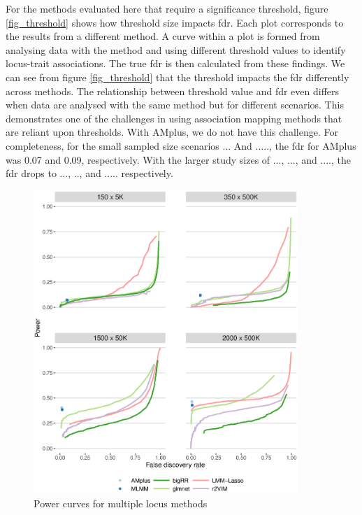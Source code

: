 \documentclass[12pt]{article}
\begin{document}
For the methods evaluated here that require a significance threshold, figure  \ref{fig_threshold}  shows how 
threshold size impacts fdr. Each plot corresponds to the results from a different method. 
A curve within a plot is formed from analysing data with the method and using different threshold values to identify locus-trait associations. 
The true fdr is then calculated from these findings.
We can see from figure \ref{fig_threshold}  that the threshold impacts the fdr differently across methods. The relationship between threshold value and fdr even differs when data are analysed with the same method but for different scenarios. This demonstrates one of the challenges in using association mapping methods that are reliant upon thresholds. With AMplus, we do not have this challenge. For completeness, for the small sampled size scenarios ... And ....., the fdr for AMplus was 0.07 and 0.09, respectively. With the larger study sizes of ..., ..., and ...., the fdr drops to ..., .., and ..... respectively.


\begin{figure}
\label{fig_power_multiple}
\caption{Power curves for  multiple locus methods}
\includegraphics[width=10cm]{powerMultiple}
\end{figure}
\end{document}
